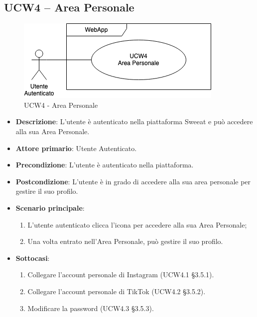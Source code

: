 \subsection{UCW4 – Area Personale}
\begin{figure}[!h]
\centering
\includegraphics[scale=0.5]{UC_images/UCW4.png}
\caption{UCW4 - Area Personale}
\end{figure}
\begin{itemize}
\item \textbf{Descrizione}: L'utente è autenticato nella piattaforma Sweeat e può accedere alla sua Area Personale.
\item \textbf{Attore primario}: Utente Autenticato.
\item \textbf{Precondizione}: L'utente è autenticato nella piattaforma.
\item \textbf{Postcondizione}: L'utente è in grado di accedere alla sua area personale per gestire il suo profilo.

\item \textbf{Scenario principale}:
\begin{enumerate}
\item L'utente autenticato clicca l'icona per accedere alla sua Area Personale;
\item Una volta entrato nell'Area Personale, può gestire il suo profilo.
\end{enumerate}

\item \textbf{Sottocasi}:
\begin{enumerate}
	\item Collegare l'account personale di Instagram (UCW4.1 \S 3.5.1).
	\item Collegare l'account personale di TikTok (UCW4.2 \S 3.5.2).
	\item Modificare la password (UCW4.3 \S 3.5.3). 
\end{enumerate}
\end{itemize}
